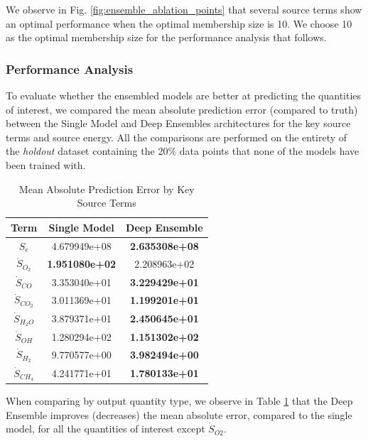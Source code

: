 \documentclass[conf]{new-aiaa}
\begin{document}
We observe in Fig. \ref{fig:ensemble_ablation_points} that several source terms show an optimal performance when the optimal membership size is 10. We choose 10 as the optimal membership size for the performance analysis that follows. 

\subsubsection{Performance Analysis}
To evaluate whether the ensembled models are better at predicting the quantities of interest, we compared the mean absolute prediction error (compared to truth) between the Single Model and Deep Ensembles architectures for the key source terms and source energy. All the comparisons are performed on the entirety of the \textit{holdout} dataset containing the 20\% data points that none of the models have been trained with. 

\begin{table}[H]
    \caption{Mean Absolute Prediction Error by Key Source Terms}
    \label{tab:mae_sm_vs_ensemble_points}
    \centering
    \begin{tabular}{|c|c|c|}
         \hline
        Term &  Single Model & Deep Ensemble \\
         \hline
           ${S}_{e}$ &          4.679949e+08 &           \textbf{2.635308e+08} \\
         $\dot{S}_{O_{2}}$ &         \textbf{ 1.951080e+02 }&           2.208963e+02 \\
         $\dot{S}_{CO}$ &          3.353040e+01 &           \textbf{3.229429e+01} \\
        $\dot{S}_{CO_{2}}$ &          3.011369e+01 &           \textbf{1.199201e+01} \\
        $\dot{S}_{H_{2}O}$ &          3.879371e+01 &           \textbf{2.450645e+01} \\
         $\dot{S}_{OH}$ &          1.280294e+02 &           \textbf{1.151302e+02} \\
         $\dot{S}_{H_{2}}$ &          9.770577e+00 &           \textbf{3.982494e+00} \\
        $\dot{S}_{CH_{4}}$ &          4.241771e+01 &           \textbf{1.780133e+01} \\    
         \hline
    \end{tabular}
\end{table}

When comparing by output quantity type, we observe in Table \ref{tab:mae_sm_vs_ensemble_points} that the Deep Ensemble improves (decreases) the mean absolute error, compared to the single model, for all the quantities of interest except $\dot{S}_{O2}$.
\end{document}
